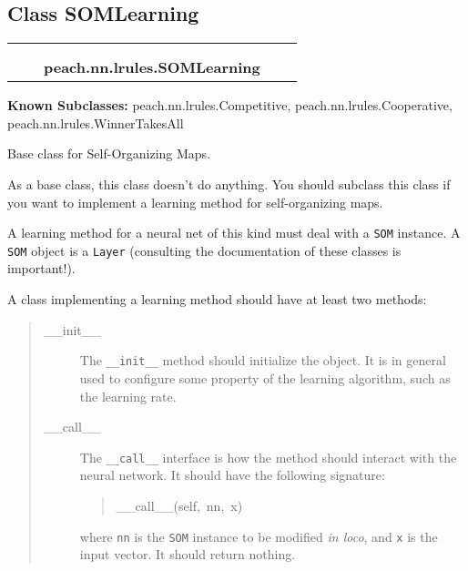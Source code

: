 \subsection{Class SOMLearning}

    \label{peach:nn:lrules:SOMLearning}
\begin{tabular}{cccccc}
\multicolumn{2}{r}{\settowidth{\BCL}{object}\multirow{2}{\BCL}{object}}
&&
  \\\cline{3-3}
  &&\multicolumn{1}{c|}{}
&&
  \\
&&\multicolumn{2}{l}{\textbf{peach.nn.lrules.SOMLearning}}
\end{tabular}

\textbf{Known Subclasses:}
peach.nn.lrules.Competitive,
    peach.nn.lrules.Cooperative,
    peach.nn.lrules.WinnerTakesAll


Base class for Self-Organizing Maps.

As a base class, this class doesn't do anything. You should subclass this
class if you want to implement a learning method for self-organizing maps.

A learning method for a neural net of this kind must deal with a \texttt{SOM}
instance. A \texttt{SOM} object is a \texttt{Layer} (consulting the documentation of
these classes is important!).

A class implementing a learning method should have at least two methods:
%
\begin{quote}
%
\begin{description}
\item[{\_\_init\_\_}] \leavevmode 
The \texttt{\_\_init\_\_} method should initialize the object. It is in general
used to configure some property of the learning algorithm, such as the
learning rate.

\item[{\_\_call\_\_}] \leavevmode 
The \texttt{\_\_call\_\_} interface is how the method should interact with the
neural network. It should have the following signature:
%
\begin{quote}{\ttfamily \raggedright \noindent
\_\_call\_\_(self,~nn,~x)
}
\end{quote}

where \texttt{nn} is the \texttt{SOM} instance to be modified \emph{in loco}, and \texttt{x}
is the input vector. It should return nothing.

\end{description}

\end{quote}


